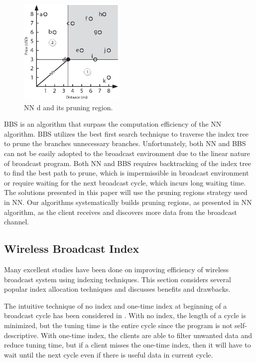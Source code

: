 \begin{figure}[h]
\begin{center}
\includegraphics[width=2in]{Figures/skyline_nn.eps}
\caption{\small NN d and its pruning region.
\label{fig:skyline_nn}}
\end{center}
\end{figure}

BBS is an algorithm that surpass the computation efficiency of the
NN algorithm. BBS utilizes the best first search technique to
traverse the index tree to prune the branches unnecessary
branches. Unfortunately, both NN and BBS can not be easily adopted
to the broadcast environment due to the linear nature of broadcast
program. Both NN and BBS requires backtracking of the index tree
to find the best path to prune, which is impermissible in
broadcast environment or require waiting for the next broadcast
cycle, which incurs long waiting time. The solutions presented in
this paper will use the pruning regions strategy used in NN. Our
algorithms systematically builds pruning regions, as presented in
NN algorithm, as the client receives and discovers more data from
the broadcast channel.


\subsection{Wireless Broadcast Index}\label{sec:wireless_bcast_index}
Many excellent studies have been done on improving efficiency of
wireless broadcast system using indexing techniques. This section
considers several popular index allocation techniques and
discusses benefits and drawbacks.

The intuitive technique of no index and one-time index at
beginning of a broadcast cycle has been considered in
\cite{data_on_air}. With no index, the length of a cycle is
minimized, but the tuning time is the entire cycle since the
program is not self-descriptive. With one-time index, the clients
are able to filter unwanted data and reduce tuning time, but if a
client misses the one-time index, then it will have to wait until
the next cycle even if there is useful data in current cycle.

